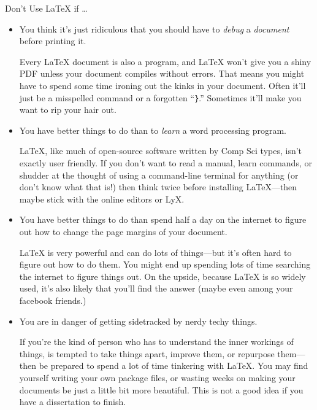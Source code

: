\begin{frame}[fragile]{Don't Use \LaTeX{} if \dots}

\begin{itemize}
\item You think it's just ridiculous that you should have to \emph{debug} a
  \emph{document} before printing it.

\begin{articleonly}
Every \LaTeX{} document is also a program, and \LaTeX{} won't give you
a shiny PDF unless your document compiles without errors.  That means
you might have to spend some time ironing out the kinks in your
document.  Often it'll just be a misspelled command or a forgotten
``\texttt{\}}.''  Sometimes it'll make you want to rip your hair out.
\end{articleonly}

\item You have better things to do than to \emph{learn} a word
  processing program.

\begin{articleonly}
\LaTeX{}, like much of open-source software written by Comp Sci types,
isn't exactly user friendly. If you don't want to read a manual, learn
commands, or shudder at the thought of using a command-line terminal
for anything (or don't know what that is!) then think twice before
installing \LaTeX---then maybe stick with the online editors or LyX.
\end{articleonly}

\item You have better things to do than spend half a
  day on the internet to figure out how to change the page margins of
  your document.

\begin{articleonly}
\LaTeX{} is very powerful and can do lots of things---but it's often
hard to figure out how to do them.  You might end up spending lots of
time searching the internet to figure things out. On the upside,
because \LaTeX{} is so widely used, it's also likely that you'll find
the answer (maybe even among your facebook friends.)
\end{articleonly}

\item You are in danger of getting sidetracked by nerdy techy things.

\begin{articleonly}
If you're the kind of person who has to understand the inner workings
of things, is tempted to take things apart, improve them, or repurpose
them---then be prepared to spend a lot of time tinkering with
\LaTeX. You may find yourself writing your own package files, or
wasting weeks on making your documents be just a little bit more
beautiful. This is not a good idea if you have a dissertation to
finish.
\end{articleonly}
\end{itemize}

\end{frame}

